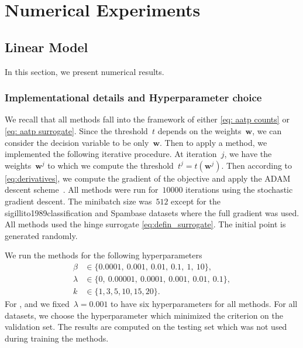 \chapter{Numerical Experiments}


\section{Linear Model}\label{sec:num1}

In this section, we present numerical results.

\subsection{Implementational details and Hyperparameter choice}

We recall that all methods fall into the framework of either \eqref{eq: aatp counts} or \eqref{eq: aatp surrogate}. Since the threshold~$t$ depends on the weights~$\bm{w}$, we can consider the decision variable to be only~$\bm{w}$. Then to apply a method, we implemented the following iterative procedure. At iteration~$j$, we have the weights~$\bm{w}^j$ to which we compute the threshold~$t^j=t(\bm{w}^j)$. Then according to \eqref{eq:derivatives}, we compute the gradient of the objective and apply the ADAM descent scheme~\cite{kingma2014adam}. All methods were run for~$10000$ iterations using the stochastic gradient descent. The minibatch size was~$512$ except for the sigillito1989classification and Spambase datasets where the full gradient was used. All methods used the hinge surrogate \eqref{eq:defin_surrogate}. The initial point is generated randomly.

We run the methods for the following hyperparameters
\begin{equation}\label{eq:beta1}
  \begin{aligned}
    \beta   & \in  \{0.0001,\ 0.001,\ 0.01,\ 0.1,\ 1,\ 10\}, \\
    \lambda & \in \{0,\ 0.00001,\ 0.0001,\ 0.001,\ 0.01,\ 0.1\}, \\
    k       & \in \{1, 3, 5, 10, 15, 20\}.
  \end{aligned}
\end{equation}
For \TopPushK, \PatMat and \PatMatNP we fixed~$\lambda=0.001$ to have six hyperparameters for all methods. For all datasets, we choose the hyperparameter which minimized the criterion on the validation set. The results are computed on the testing set which was not used during training the methods.

